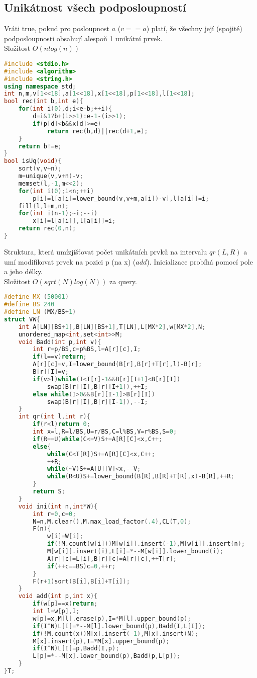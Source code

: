 \documentclass[11pt]{article}
\begin{document}
\subsection{Unikátnost všech podposloupností}
Vráti true, pokud pro posloupnost $a$ ($v==a$) platí, že všechny její (spojité) podposloupnosti obsahují alespoň 1 unikátní prvek.
\\Složitost $O(nlog(n))$
\begin{lstlisting}[language=C++]
#include <stdio.h>
#include <algorithm>
#include <string.h>
using namespace std;
int n,m,v[1<<18],a[1<<18],x[1<<18],p[1<<18],l[1<<18];
bool rec(int b,int e){
    for(int i(0),d;i<e-b;++i){
        d=i&1?b+(i>>1):e-1-(i>>1);
        if(p[d]<b&&x[d]>=e)
            return rec(b,d)||rec(d+1,e);
    }
    return b!=e;
}
bool isUq(void){
    sort(v,v+n);
    m=unique(v,v+n)-v;
    memset(l,-1,m<<2);
    for(int i(0);i<n;++i)
        p[i]=l[a[i]=lower_bound(v,v+m,a[i])-v],l[a[i]]=i;
    fill(l,l+m,n);
    for(int i(n-1);~i;--i)
        x[i]=l[a[i]],l[a[i]]=i;
    return rec(0,n);
}
\end{lstlisting}
Struktura, která umízjišťovat počet unikátních prvků na intervalu $qr(L,R)$ a umí modifikovat prvek na pozici \textsf{p} (na \textsf{x}) ($add$). Inicializace probíhá pomocí pole a jeho délky.
\\Složitost $O(sqrt(N)log(N))$ za query.
\begin{lstlisting}[language=C++]
#define MX (50001)
#define BS 240
#define LN (MX/BS+1)
struct VW{
	int A[LN][BS+1],B[LN][BS+1],T[LN],L[MX*2],w[MX*2],N;
	unordered_map<int,set<int>>M;
	void Badd(int p,int v){
		int r=p/BS,c=p%BS,l=A[r][c],I;
		if(l==v)return;
		A[r][c]=v,I=lower_bound(B[r],B[r]+T[r],l)-B[r];
		B[r][I]=v;
		if(v>l)while(I<T[r]-1&&B[r][I+1]<B[r][I])
            swap(B[r][I],B[r][I+1]),++I;
		else while(I>0&&B[r][I-1]>B[r][I])
            swap(B[r][I],B[r][I-1]),--I;
	}
	int qr(int l,int r){
		if(r<l)return 0;
		int x=l,R=l/BS,U=r/BS,C=l%BS,V=r%BS,S=0;
		if(R==U)while(C<=V)S+=A[R][C]<x,C++;
		else{
			while(C<T[R])S+=A[R][C]<x,C++;
			++R;
			while(~V)S+=A[U][V]<x,--V;
			while(R<U)S+=lower_bound(B[R],B[R]+T[R],x)-B[R],++R;
		}
		return S;
	}
	void ini(int n,int*W){
        int r=0,c=0;
        N=n,M.clear(),M.max_load_factor(.4),CL(T,0);
        F(n){
			w[i]=W[i];
            if(!M.count(w[i]))M[w[i]].insert(-1),M[w[i]].insert(n);		
			M[w[i]].insert(i),L[i]=*--M[w[i]].lower_bound(i);
			A[r][c]=L[i],B[r][c]=A[r][c],++T[r];
			if(++c==BS)c=0,++r;
		}
        F(r+1)sort(B[i],B[i]+T[i]);
	}
	void add(int p,int x){
		if(w[p]==x)return;
		int l=w[p],I;
		w[p]=x,M[l].erase(p),I=*M[l].upper_bound(p);
		if(I^N)L[I]=*--M[l].lower_bound(p),Badd(I,L[I]);
        if(!M.count(x))M[x].insert(-1),M[x].insert(N);
		M[x].insert(p),I=*M[x].upper_bound(p);
		if(I^N)L[I]=p,Badd(I,p);
		L[p]=*--M[x].lower_bound(p),Badd(p,L[p]);
	}
}T;

\end{lstlisting}
\end{document}

